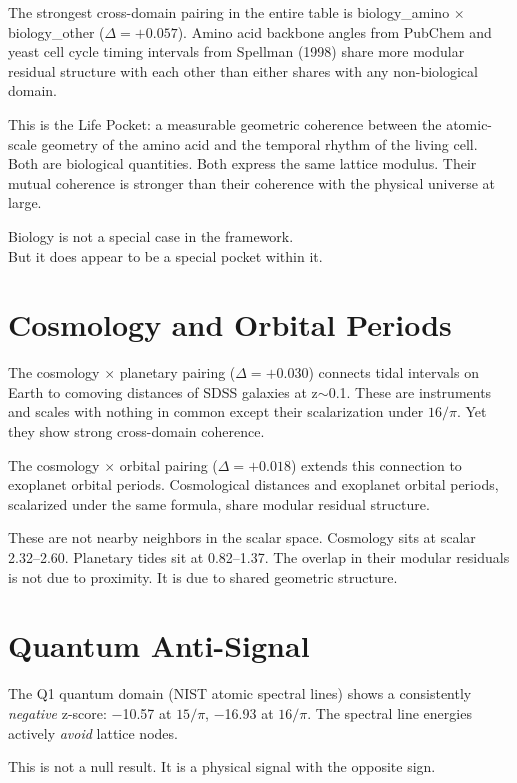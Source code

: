 \documentclass[11pt, letterpaper, openany]{book}
\begin{document}
The strongest cross-domain pairing in the entire table is biology\_amino $\times$
biology\_other ($\Delta = +0.057$). Amino acid backbone angles from PubChem and yeast cell
cycle timing intervals from Spellman (1998) share more modular residual structure with each
other than either shares with any non-biological domain.

This is the Life Pocket: a measurable geometric coherence between the atomic-scale geometry
of the amino acid and the temporal rhythm of the living cell. Both are biological quantities.
Both express the same lattice modulus. Their mutual coherence is stronger than their
coherence with the physical universe at large.

Biology is not a special case in the framework.\\
But it does appear to be a special pocket within it.

\section*{Cosmology and Orbital Periods}

The cosmology $\times$ planetary pairing ($\Delta = +0.030$) connects tidal intervals on
Earth to comoving distances of SDSS galaxies at z$\sim$0.1. These are instruments and
scales with nothing in common except their scalarization under $16/\pi$. Yet they show
strong cross-domain coherence.

The cosmology $\times$ orbital pairing ($\Delta = +0.018$) extends this connection to
exoplanet orbital periods. Cosmological distances and exoplanet orbital periods, scalarized
under the same formula, share modular residual structure.

These are not nearby neighbors in the scalar space. Cosmology sits at scalar 2.32--2.60.
Planetary tides sit at 0.82--1.37. The overlap in their modular residuals is not due to
proximity. It is due to shared geometric structure.

\section*{Quantum Anti-Signal}

The Q1 quantum domain (NIST atomic spectral lines) shows a consistently \emph{negative}
z-score: $-$10.57 at $15/\pi$, $-$16.93 at $16/\pi$. The spectral line energies actively
\emph{avoid} lattice nodes.

This is not a null result. It is a physical signal with the opposite sign.
\end{document}
